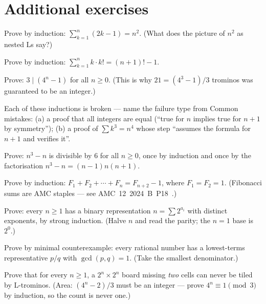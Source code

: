 \section{Additional exercises}
\begin{exercise}[easy]
Prove by induction: $\sum_{k=1}^{n} (2k - 1) = n^2$. (What does the picture
of $n^2$ as nested Ls say?)
\end{exercise}
\begin{exercise}[easy]
Prove by induction: $\sum_{k=1}^{n} k \cdot k! = (n+1)! - 1$.
\end{exercise}
\begin{exercise}[easy]
Prove: $3 \mid (4^n - 1)$ for all $n \ge 0$. (This is why $21 = (4^3-1)/3$
trominos was guaranteed to be an integer.)
\end{exercise}
\begin{exercise}[easy]
Each of these inductions is broken --- name the failure type from Common
mistakes: (a) a proof that all integers are equal (``true for $n$ implies
true for $n+1$ by symmetry''); (b) a proof of $\sum k^3 = n^4$ whose step
``assumes the formula for $n+1$ and verifies it''.
\end{exercise}
\begin{exercise}[medium]
Prove: $n^3 - n$ is divisible by $6$ for all $n \ge 0$, once by induction and
once by the factorisation $n^3 - n = (n-1)n(n+1)$.
\end{exercise}
\begin{exercise}[medium]
Prove by induction: $F_1 + F_2 + \cdots + F_n = F_{n+2} - 1$, where
$F_1 = F_2 = 1$. (Fibonacci sums are AMC staples --- see
AMC~12~2024~B~P18~\cite{aops-amc}.)
\end{exercise}
\begin{exercise}[medium]
Prove: every $n \ge 1$ has a binary representation $n = \sum 2^{a_i}$ with
distinct exponents, by strong induction. (Halve $n$ and read the parity; the
$n=1$ base is $2^0$.)
\end{exercise}
\begin{exercise}[medium]
Prove by minimal counterexample: every rational number has a lowest-terms
representative $p/q$ with $\gcd(p,q) = 1$. (Take the smallest denominator.)
\end{exercise}
\begin{exercise}[hard]
Prove that for every $n \ge 1$, a $2^n \times 2^n$ board missing \emph{two}
cells can never be tiled by L-trominos. (Area: $(4^n - 2)/3$ must be an
integer --- prove $4^n \equiv 1 \pmod 3$ by induction, so the count is never
one.)
\end{exercise}
